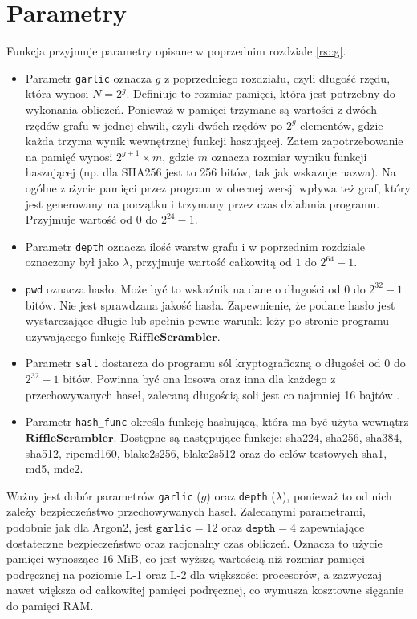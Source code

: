 \section{Parametry}
Funkcja przyjmuje parametry opisane w poprzednim rozdziale \ref{rs::g}.
\begin{itemize}
	\item Parametr \texttt{garlic} oznacza $g$ z poprzedniego rozdziału, czyli długość rzędu, która wynosi $N = 2^{g}$.
	Definiuje to rozmiar pamięci, która jest potrzebny do wykonania obliczeń.
	Ponieważ w pamięci trzymane są wartości z dwóch rzędów grafu w jednej chwili, czyli dwóch rzędów po $2^g$ elementów, gdzie każda trzyma wynik wewnętrznej funkcji haszującej. Zatem zapotrzebowanie na pamięć wynosi $2^{g + 1} \times m$, gdzie $m$ oznacza rozmiar wyniku funkcji haszującej (np. dla SHA256 jest to 256 bitów, tak jak wskazuje nazwa).
	Na ogólne zużycie pamięci przez program w obecnej wersji wpływa też graf, który jest generowany na początku i trzymany przez czas działania programu. Przyjmuje wartość od $0$ do $2^{24} - 1$.
	
	\item Parametr \texttt{depth} oznacza ilość warstw grafu i w poprzednim rozdziale oznaczony był jako $\lambda$, przyjmuje wartość całkowitą od $1$ do $2^{64} - 1$.
	
	\item \texttt{pwd} oznacza hasło. Może być to wskaźnik na dane o długości od $0$ do $2^{32} -1$ bitów. Nie jest sprawdzana jakość hasła.
	Zapewnienie, że podane hasło jest wystarczające długie lub spełnia pewne warunki leży po stronie programu używającego funkcję $\mathbf{RiffleScrambler}$.
	\item Parametr \texttt{salt} dostarcza do programu sól kryptograficzną o długości od $0$ do $2^{32} - 1$ bitów. Powinna być ona losowa oraz inna dla każdego z przechowywanych haseł, zalecaną długością soli jest co najmniej 16 bajtów \cite{PHC2013}.
	
	\item Parametr \texttt{hash\_func} określa funkcję hashującą, która ma być użyta wewnątrz $\mathbf{RiffleScrambler}$. Dostępne są następujące funkcje: sha224, sha256, sha384, sha512, ripemd160, blake2s256, blake2s512 oraz do celów testowych sha1, md5, mdc2.
\end{itemize}

Ważny jest dobór parametrów \texttt{garlic} ($g$) oraz \texttt{depth} ($\lambda$), ponieważ to od nich zależy bezpieczeństwo przechowywanych haseł. Zalecanymi parametrami, podobnie jak dla Argon2, jest $\texttt{garlic}=12$ oraz $\texttt{depth}=4$ zapewniające dostateczne bezpieczeństwo oraz racjonalny czas obliczeń. Oznacza to użycie pamięci wynoszące $16$ MiB, co jest wyższą wartością niż rozmiar pamięci podręcznej na poziomie L-1 oraz L-2 dla większości procesorów, a zazwyczaj nawet większa od całkowitej pamięci podręcznej, co wymusza kosztowne sięganie do pamięci RAM. 

